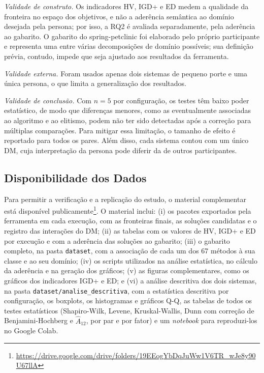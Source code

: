\documentclass[conference]{IEEEtran}
\begin{document}
\textit{Validade de construto.} Os indicadores HV, IGD+ e ED medem a qualidade da fronteira no espaço dos objetivos, e não a aderência semântica ao domínio desejada pela persona; por isso, a RQ2 é avaliada separadamente, pela aderência ao gabarito. O gabarito do spring-petclinic foi elaborado pelo próprio participante e representa uma entre várias decomposições de domínio possíveis; sua definição prévia, contudo, impede que seja ajustado aos resultados da ferramenta.

\textit{Validade externa.} Foram usados apenas dois sistemas de pequeno porte e uma única persona, o que limita a generalização dos resultados.

\textit{Validade de conclusão.} Com $n=5$ por configuração, os testes têm baixo poder estatístico, de modo que diferenças menores, como as eventualmente associadas ao algoritmo e ao elitismo, podem não ter sido detectadas após a correção para múltiplas comparações. Para mitigar essa limitação, o tamanho de efeito é reportado para todos os pares. Além disso, cada sistema contou com um único DM, cuja interpretação da persona pode diferir da de outros participantes.

\subsection{Disponibilidade dos Dados}\label{sec:dados}

Para permitir a verificação e a replicação do estudo, o material complementar está disponível publicamente\footnote{\url{https://drive.google.com/drive/folders/19EEogYbDqJuWw1V6TR_wJe8y90U67llA}}. O material inclui: (i) os pacotes exportados pela ferramenta em cada execução, com as fronteiras finais, as soluções candidatas e o registro das interações do DM; (ii) as tabelas com os valores de HV, IGD+ e ED por execução e com a aderência das soluções ao gabarito; (iii) o gabarito completo, na pasta \texttt{dataset}, com a associação de cada um dos 67 métodos à sua classe e ao seu domínio; (iv) os scripts utilizados na análise estatística, no cálculo da aderência e na geração dos gráficos; (v) as figuras complementares, como os gráficos dos indicadores IGD+ e ED; e (vi) a análise descritiva dos dois sistemas, na pasta \texttt{dataset/analise\_descritiva}, com a estatística descritiva por configuração, os boxplots, os histogramas e gráficos Q-Q, as tabelas de todos os testes estatísticos (Shapiro-Wilk, Levene, Kruskal-Wallis, Dunn com correção de Benjamini-Hochberg e $\hat{A}_{12}$, por par e por fator) e um \textit{notebook} para reproduzi-los no Google Colab.
\end{document}
